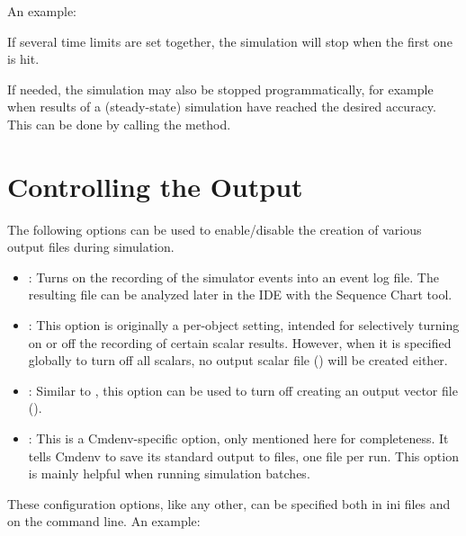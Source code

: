 An example:


If several time limits are set together, the simulation will stop when the first
one is hit.


If needed, the simulation may also be stopped programmatically, for example when
results of a (steady-state) simulation have reached the desired accuracy.
This can be done by calling the  method.


\section{Controlling the Output}
\label{sec:run-sim:output-control}

The following options can be used to enable/disable the creation of various
output files during simulation.

\begin{itemize}
  \item {} : Turns on the recording of the simulator
        events into an event log file. The resulting  file can be
        analyzed later in the IDE with the Sequence Chart tool.

  \item {} : This option is originally a
        per-object setting, intended for selectively turning on or off the
        recording of certain scalar results. However, when it is specified
        globally to turn off all scalars, no output scalar file
        () will be created either.

  \item {} : Similar to ,
        this option can be used to turn off creating an output vector file
        ().

  \item {} : This is a Cmdenv-specific option,
        only mentioned here for completeness. It tells Cmdenv to save its
        standard output to files, one file per run. This option is mainly
        helpful when running simulation batches.

\end{itemize}

These configuration options, like any other, can be specified both in ini
files and on the command line. An example:

